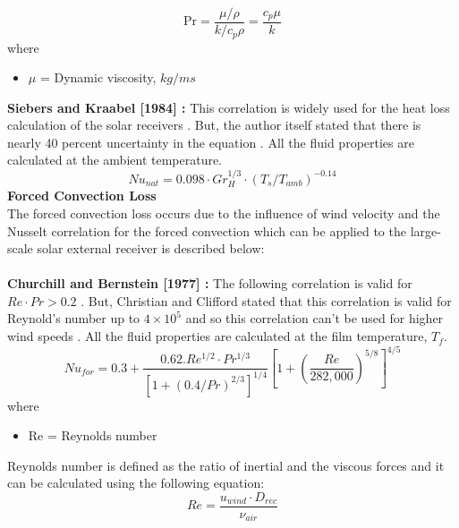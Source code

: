 \begin{equation}
\mathrm{Pr} = \frac{\mu / \rho}{k / c_p \rho} = \frac{c_p \mu}{k}
\end{equation}
where 
\begin{itemize}
	\item $\mu$ = Dynamic viscosity, $kg/m s$
\end{itemize}
\textbf{Siebers and Kraabel [1984] \cite{Siebers.1984}:}
This correlation is widely used for the heat loss calculation of the solar receivers \cite{Christian.2012}.  But, the author itself stated that there is nearly 40 percent uncertainty in the equation \cite{Siebers.1984}. All the fluid properties are calculated at the ambient temperature.
\begin{equation}
Nu_{nat}=0.098\cdot Gr_H^{1/3}\cdot(T_s/T_{amb})^{-0.14}
\label{siebers_natural_external_convection}
\end{equation}
\textbf{Forced Convection Loss}\\[0.25cm]
The forced convection loss occurs due to the influence of wind velocity and the Nusselt correlation for the forced convection which can be applied to the large-scale solar external receiver is described below: \\\\
\textbf{Churchill and Bernstein [1977] \cite {Cengel.2003}:}
The following correlation is valid for $Re\cdot Pr > 0.2$ \cite{Cengel.2003}. But, Christian and Clifford stated that this correlation is valid for Reynold's number up to $4 \times 10^5$ and so this correlation can't be used for higher wind speeds \cite{Christian.2012}. All the fluid properties are calculated at the film temperature, $T_f$.\\
\begin{equation}
Nu_{for}=0.3+\frac{0.62.Re^{1/2}\cdot Pr^{1/3}}{[1+(0.4/Pr)^{2/3}]^{1/4}}\left[1+\left(\frac{Re}{282,000}\right)^{5/8}\right]^{4/5}
\end{equation}
where
\begin{itemize}
	\item Re = Reynolds number
\end{itemize}
Reynolds number is defined as the ratio of inertial and the viscous forces and it can be calculated using the following equation:
\begin{equation}
Re =\frac{u_{wind}\cdot D_{rec}}{\nu_{air}}
\end{equation}
